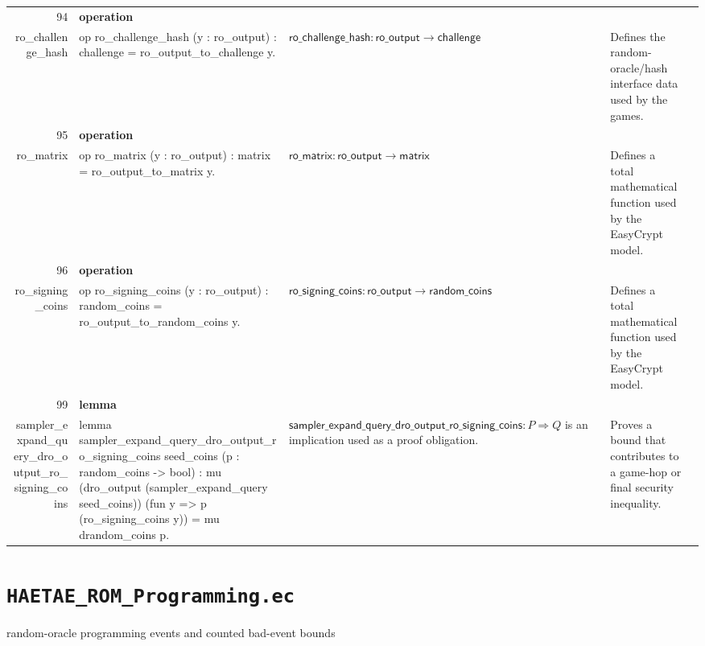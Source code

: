 \documentclass[10pt]{article}
\newcommand{\ec}[1]{\begingroup\ttfamily\scriptsize #1\endgroup}
\begin{document}
\begin{longtable}{r L{0.17\textwidth} L{0.26\textwidth} L{0.27\textwidth} L{0.20\textwidth}}
94 & \textbf{operation}\\\ec{ro\_challenge\_hash} & \ec{op ro\_challenge\_hash (y : ro\_output) : challenge = ro\_output\_to\_challenge y.} & \(\mathsf{ro\_challenge\_hash} : \mathsf{ro\_output} \to \mathsf{challenge}\) & Defines the random-oracle/hash interface data used by the games. \\
95 & \textbf{operation}\\\ec{ro\_matrix} & \ec{op ro\_matrix (y : ro\_output) : matrix = ro\_output\_to\_matrix y.} & \(\mathsf{ro\_matrix} : \mathsf{ro\_output} \to \mathsf{matrix}\) & Defines a total mathematical function used by the EasyCrypt model. \\
96 & \textbf{operation}\\\ec{ro\_signing\_coins} & \ec{op ro\_signing\_coins (y : ro\_output) : random\_coins = ro\_output\_to\_random\_coins y.} & \(\mathsf{ro\_signing\_coins} : \mathsf{ro\_output} \to \mathsf{random\_coins}\) & Defines a total mathematical function used by the EasyCrypt model. \\
99 & \textbf{lemma}\\\ec{sampler\_expand\_query\_dro\_output\_ro\_signing\_coins} & \ec{lemma sampler\_expand\_query\_dro\_output\_ro\_signing\_coins seed\_coins (p : random\_coins -> bool) : mu (dro\_output (sampler\_expand\_query seed\_coins)) (fun y => p (ro\_signing\_coins y)) = mu drandom\_coins p.} & \(\mathsf{sampler\_expand\_query\_dro\_output\_ro\_signing\_coins} : P \Rightarrow Q\) is an implication used as a proof obligation. & Proves a bound that contributes to a game-hop or final security inequality. \\
\bottomrule
\end{longtable}

\clearpage
\section{\texorpdfstring{\texttt{HAETAE\_ROM\_Programming.ec}}{HAETAE ROM Programming.ec}}
random-oracle programming events and counted bad-event bounds
\end{document}
